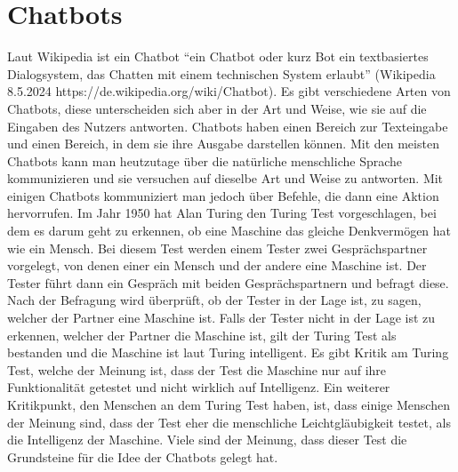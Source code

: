 \section{Chatbots}
\label{s:intro:bot}
Laut Wikipedia ist ein Chatbot “ein Chatbot oder kurz Bot ein textbasiertes Dialogsystem, das Chatten mit einem technischen System erlaubt” (Wikipedia 8.5.2024 https://de.wikipedia.org/wiki/Chatbot). Es gibt verschiedene Arten von Chatbots, diese unterscheiden sich aber in der Art und Weise, wie sie auf die Eingaben des Nutzers antworten. Chatbots haben einen Bereich zur Texteingabe und einen Bereich, in dem sie ihre Ausgabe darstellen können. Mit den meisten Chatbots kann man heutzutage über die natürliche menschliche Sprache kommunizieren und sie versuchen auf dieselbe Art und Weise zu antworten. Mit einigen Chatbots kommuniziert man jedoch über Befehle, die dann eine Aktion hervorrufen. 
Im Jahr 1950 hat Alan Turing den Turing Test vorgeschlagen, bei dem es darum geht zu erkennen, ob eine Maschine das gleiche Denkvermögen hat wie ein Mensch. Bei diesem Test werden einem Tester zwei Gesprächspartner vorgelegt, von denen einer ein Mensch und der andere eine Maschine ist. Der Tester führt dann ein Gespräch mit beiden Gesprächspartnern und befragt diese. Nach der Befragung wird überprüft, ob der Tester in der Lage ist, zu sagen, welcher der Partner eine Maschine ist. Falls der Tester nicht in der Lage ist zu erkennen, welcher der Partner die Maschine ist, gilt der Turing Test als bestanden und die Maschine ist laut Turing intelligent. Es gibt Kritik am Turing Test, welche der Meinung ist, dass der Test die Maschine nur auf ihre Funktionalität getestet und nicht wirklich auf Intelligenz. Ein weiterer Kritikpunkt, den Menschen an dem Turing Test haben, ist, dass einige Menschen der Meinung sind, dass der Test eher die menschliche Leichtgläubigkeit testet, als die Intelligenz der Maschine. Viele sind der Meinung, dass dieser Test die Grundsteine für die Idee der Chatbots gelegt hat.  
